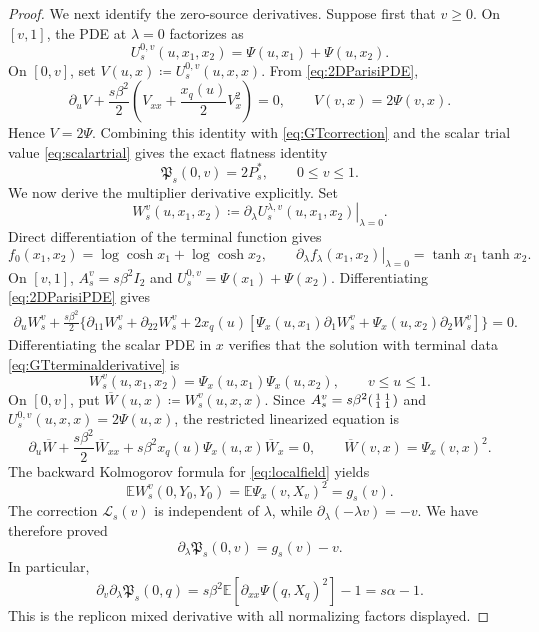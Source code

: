 \documentclass[11pt]{article}
\numberwithin{equation}{section}
\newcommand{\E}{\mathbb{E}}
\newcommand{\1}{\mathbf 1}
\begin{document}
\begin{proof}
We next identify the zero-source derivatives.  Suppose first that
$v\ge0$.  On $[v,1]$, the PDE at $\lambda=0$ factorizes as
\[
 U^{0,v}_s(u,x_1,x_2)=\Psi(u,x_1)+\Psi(u,x_2).
\]
On $[0,v]$, set $V(u,x)\coloneqq U^{0,v}_s(u,x,x)$.  From
\eqref{eq:2DParisiPDE},
\[
 \partial_uV+\frac{s\beta^2}{2}
 \left(V_{xx}+\frac{x_q(u)}2V_x^2\right)=0,
 \qquad V(v,x)=2\Psi(v,x).
\]
Hence $V=2\Psi$.  Combining this identity with
\eqref{eq:GTcorrection} and the scalar trial value
\eqref{eq:scalartrial} gives the exact flatness identity
\begin{equation}
 \mathfrak P_s(0,v)=2P_s^*,
 \qquad 0\le v\le1.
 \label{eq:GTflat}
\end{equation}
We now derive the multiplier derivative explicitly.  Set
\[
 W^{v}_s(u,x_1,x_2)
 \coloneqq\left.\partial_\lambda
 U^{\lambda,v}_s(u,x_1,x_2)\right|_{\lambda=0}.
\]
Direct differentiation of the terminal function gives
\begin{equation}
 f_0(x_1,x_2)=\log\cosh x_1+\log\cosh x_2,\qquad
 \left.\partial_\lambda f_\lambda(x_1,x_2)\right|_{\lambda=0}
 =\tanh x_1\tanh x_2.
 \label{eq:GTterminalderivative}
\end{equation}
On $[v,1]$, $A_s^v=s\beta^2I_2$ and
$U_s^{0,v}=\Psi(x_1)+\Psi(x_2)$.  Differentiating
\eqref{eq:2DParisiPDE} gives
\begin{align}
 \partial_uW_s^v+\frac{s\beta^2}{2}\bigl\{
 \partial_{11}W_s^v+\partial_{22}W_s^v
 +2x_q(u)[\Psi_x(u,x_1)\partial_1W_s^v
          +\Psi_x(u,x_2)\partial_2W_s^v]\bigr\}=0.
 \label{eq:GTlinearizedupper}
\end{align}
Differentiating the scalar PDE in $x$ verifies that the solution with
terminal data \eqref{eq:GTterminalderivative} is
\begin{equation}
 W_s^v(u,x_1,x_2)
 =\Psi_x(u,x_1)\Psi_x(u,x_2),\qquad v\le u\le1.
 \label{eq:GTlinearizedproduct}
\end{equation}
On $[0,v]$, put $\overline W(u,x)\coloneqq W_s^v(u,x,x)$.  Since
$A_s^v=s\beta^2\begin{psmallmatrix}1&1\\1&1\end{psmallmatrix}$ and
$U_s^{0,v}(u,x,x)=2\Psi(u,x)$, the restricted linearized equation is
\begin{equation}
 \partial_u\overline W+\frac{s\beta^2}{2}\overline W_{xx}
 +s\beta^2x_q(u)\Psi_x(u,x)\overline W_x=0,\qquad
 \overline W(v,x)=\Psi_x(v,x)^2.
 \label{eq:GTlinearizedlower}
\end{equation}
The backward Kolmogorov formula for \eqref{eq:localfield} yields
\[
 \E W_s^v(0,Y_0,Y_0)=\E\Psi_x(v,X_v)^2=g_s(v).
\]
The correction $\mathcal L_s(v)$ is independent of $\lambda$, while
$\partial_\lambda(-\lambda v)=-v$.  We have therefore proved
\begin{equation}
 \partial_\lambda\mathfrak P_s(0,v)=g_s(v)-v.
 \label{eq:GTfirstderivative}
\end{equation}
In particular,
\begin{equation}
 \partial_v\partial_\lambda\mathfrak P_s(0,q)
 =s\beta^2\E[\partial_{xx}\Psi(q,X_q)^2]-1
 =s\alpha-1.
 \label{eq:GTmixedderivative}
\end{equation}
This is the replicon mixed derivative with all normalizing factors
displayed.


\end{proof}
\end{document}
